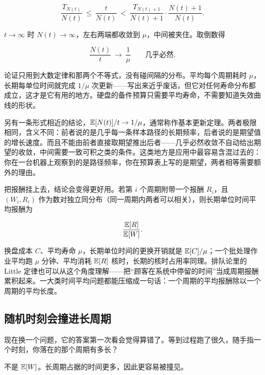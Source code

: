 \[
\frac{T_{N(t)}}{N(t)}\ \le\ \frac{t}{N(t)}\ <\ \frac{T_{N(t)+1}}{N(t)+1}\cdot\frac{N(t)+1}{N(t)}.
\]

\(t\to\infty\) 时 \(N(t)\to\infty\)，左右两端都收敛到 \(\mu\)，中间被夹住。取倒数得

\[
\frac{N(t)}{t}\ \longrightarrow\ \frac1\mu
\qquad\text{几乎必然}.
\]

论证只用到大数定律和那两个不等式，没有碰间隔的分布。平均每个周期耗时 \(\mu\)，长期每单位时间就完成 \(1/\mu\) 次更新——写出来近乎废话，但它对任何寿命分布都成立，这才是它有用的地方。硬盘的备件预算只需要平均寿命，不需要知道失效曲线的形状。

另有一条形式相近的结论，\(\mathbb{E}[N(t)]/t\to1/\mu\)，通常称作基本更新定理。两者极限相同，含义不同：前者说的是几乎每一条样本路径的长期频率，后者说的是期望值的增长速度。而且不能由前者直接取期望推出后者——几乎必然收敛不自动给出期望的收敛，中间需要一致可积之类的条件。这类地方是应用中最容易含混过去的：你在一台机器上观察到的是路径频率，你在预算表上写的是期望，两者相等需要额外的理由。

把报酬挂上去，结论会变得更好用。若第 \(i\) 个周期附带一个报酬 \(R_i\)，且 \((W_i,R_i)\) 作为数对独立同分布（同一周期内两者可以相关），则长期单位时间平均报酬为

\[
\frac{\mathbb{E}[R]}{\mathbb{E}[W]}.
\]

换盘成本 \(C\)、平均寿命 \(\mu\)，长期单位时间的更换开销就是 \(\mathbb{E}[C]/\mu\)；一个批处理作业平均跑 \(\mu\) 分钟、平均消耗 \(\mathbb{E}[R]\) 核时，长期的核时占用率同理。排队论里的 Little 定律也可以从这个角度理解——把``顾客在系统中停留的时间''当成周期报酬累积起来。一大类时间平均问题都能压缩成一句话：一个周期的平均报酬除以一个周期的平均长度。

\subsection{随机时刻会撞进长周期}

现在换一个问题，它的答案第一次看会觉得算错了。等到过程跑了很久，随手指一个时刻，你落在的那个周期有多长？

不是 \(\mathbb{E}[W]\)。长周期占据的时间更多，因此更容易被撞见。

